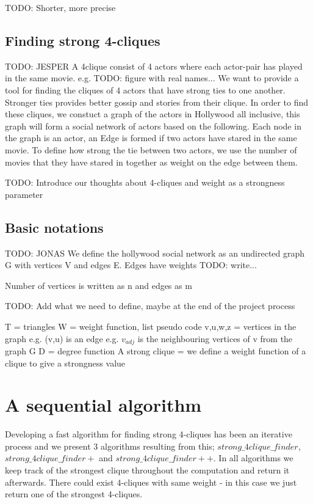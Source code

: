 \documentclass{article}
\begin{document}
TODO: Shorter, more precise


\subsection{Finding strong 4-cliques}
TODO: JESPER
A 4clique consist of 4 actors where each actor-pair has played in the same movie. e.g. TODO: figure with real names...
\noindent We want to provide a tool for finding the cliques of 4 actors that have strong ties to one another. Stronger ties provides better gossip and stories from their clique. In order to find these cliques, we constuct a graph of the actors in Hollywood all inclusive, this graph will form a social network of actors based on the following.
Each node in the graph is an actor, an Edge is formed if two actors have stared in the same movie. To define how strong the tie between two actors, we use the number of movies that they have stared in together as weight on the edge between them.

TODO: Introduce our thoughts about 4-cliques and weight as a strongness parameter

\subsection{Basic notations}
TODO: JONAS
We define the hollywood social network as an undirected graph G with vertices V and edges E.
Edges have weights TODO: write...

Number of vertices is written as n and edges as m

TODO: Add what we need to define, maybe at the end of the project process

T = triangles
W = weight function, list pseudo code
v,u,w,z = vertices in the graph
e.g. (v,u) is an edge
e.g. $v_{adj}$ is the neighbouring vertices of v from the graph G
D = degree function
A strong clique = we define a weight function of a clique to give a strongness value


\section{A sequential algorithm}
Developing a fast algorithm for finding strong 4-cliques has been an iterative process and we present 3 algorithms resulting from this; $strong\_4clique\_finder$, $strong\_4clique\_finder+$ and $strong\_4clique\_finder++$. In all algorithms we keep track of the strongest clique throughout the computation and return it afterwards. There could exist 4-cliques with same weight - in this case we just return one of the strongest 4-cliques.
\end{document}
